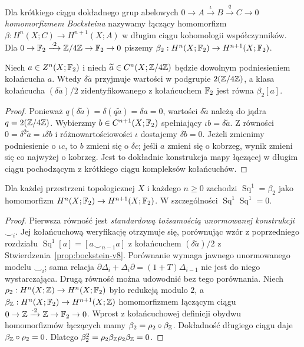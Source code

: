 \begin{definicja}
Dla krótkiego ciągu dokładnego grup abelowych
$0\to A\xrightarrow{\iota}B\xrightarrow{q}C\to0$
\emph{homomorfizmem Bocksteina} nazywamy łączący homomorfizm
$\beta:H^n(X;C)\to H^{n+1}(X;A)$
w długim ciągu kohomologii współczynników.
Dla $0\to\mathbb{F}_2\xrightarrow{\,\cdot2\,}\mathbb{Z}/4\mathbb{Z}\to\mathbb{F}_2\to0$
piszemy $\beta_2:H^n(X;\mathbb{F}_2)\to H^{n+1}(X;\mathbb{F}_2)$.
\end{definicja}

\begin{stwierdzenie}
\label{prop:bockstein-v8}
Niech $a\in Z^n(X;\mathbb{F}_2)$ i niech $\widetilde a\in C^n(X;\mathbb{Z}/4\mathbb{Z})$
będzie dowolnym podniesieniem kołańcucha $a$. Wtedy
$\delta\widetilde a$ przyjmuje wartości w podgrupie
$2(\mathbb{Z}/4\mathbb{Z})$, a klasa kołańcucha
$(\delta\widetilde a)/2$ zidentyfikowanego z kołańcuchem
$\mathbb{F}_2$ jest równa $\beta_2[a]$.
\end{stwierdzenie}
\begin{proof}
Ponieważ $q(\delta\widetilde a)=\delta(q\widetilde a)=\delta a=0$,
wartości $\delta\widetilde a$ należą do jądra $q=2(\mathbb{Z}/4\mathbb{Z})$.
Wybierzmy $b\in C^{n+1}(X;\mathbb{F}_2)$ spełniający
$\iota b=\delta\widetilde a$. Z równości
$0=\delta^2\widetilde a=\iota\delta b$ i różnowartościowości
$\iota$ dostajemy $\delta b=0$.
Jeżeli zmienimy podniesienie o $\iota c$, to $b$ zmieni się
o $\delta c$; jeśli $a$ zmieni się o kobrzeg, wynik zmieni się
co najwyżej o kobrzeg. Jest to dokładnie konstrukcja mapy łączącej
w długim ciągu pochodzącym z krótkiego ciągu kompleksów kołańcuchów.
\end{proof}

\begin{twierdzenie}
\label{thm:sq1-bock-v8}
Dla każdej przestrzeni topologicznej $X$ i każdego $n\ge0$
zachodzi $\operatorname{Sq}^1=\beta_2$ jako homomorfizm
$H^n(X;\mathbb{F}_2)\to H^{n+1}(X;\mathbb{F}_2)$.
W szczególności $\operatorname{Sq}^1\operatorname{Sq}^1=0$.
\end{twierdzenie}
\begin{proof}
Pierwsza równość jest \emph{standardową tożsamością unormowanej
konstrukcji $\smile_i$}. Jej kołańcuchową weryfikację otrzymuje się,
porównując wzór z poprzedniego rozdziału
$\operatorname{Sq}^1[a]=[a\smile_{n-1}a]$
z kołańcuchem $(\delta\widetilde a)/2$ z
Stwierdzenia~\ref{prop:bockstein-v8}. Porównanie wymaga jawnego
unormowanego modelu $\smile_i$; sama relacja
$\partial\Delta_i+\Delta_i\partial=(1+T)\Delta_{i-1}$
nie jest do niego wystarczająca. Drugą równość można udowodnić bez tego porównania.
Niech $\rho_2:H^n(X;\mathbb{Z})\to H^n(X;\mathbb{F}_2)$
było redukcją modulo $2$, a
$\beta_{\mathbb{Z}}:H^n(X;\mathbb{F}_2)\to H^{n+1}(X;\mathbb{Z})$
homomorfizmem łączącym ciągu
$0\to\mathbb{Z}\xrightarrow{\cdot2}\mathbb{Z}\to\mathbb{F}_2\to0$.
Wprost z kołańcuchowej definicji obydwu homomorfizmów
łączących mamy $\beta_2=\rho_2\circ\beta_{\mathbb{Z}}$.
Dokładność długiego ciągu daje
$\beta_{\mathbb{Z}}\circ\rho_2=0$. Dlatego
$\beta_2^2=\rho_2\beta_{\mathbb{Z}}\rho_2\beta_{\mathbb{Z}}=0$.
\end{proof}

